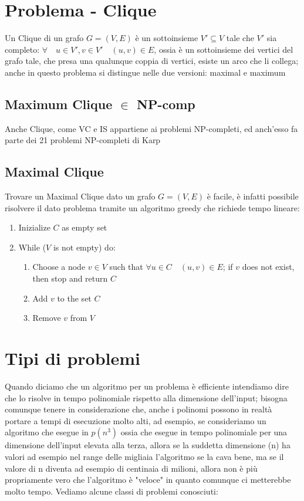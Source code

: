 \documentclass[12pt,a4paper]{article}
\begin{document}
\section{Problema - Clique}
Un Clique di un grafo $G = (V, E)$ è un sottoinsieme $V' \subseteq V$ tale che $V'$ sia completo:
$\forall \quad u \in V', v \in V' \quad (u, v) \in E$, ossia è un sottoinsieme dei vertici del grafo tale, che presa una qualunque coppia di vertici, esiste un arco che li collega; anche in questo problema si distingue nelle due versioni: maximal e maximum

\subsection{Maximum Clique $\in$ NP-comp}
Anche Clique, come VC e IS appartiene ai problemi NP-completi, ed anch'esso fa parte dei 21 problemi NP-completi di Karp

\subsection{Maximal Clique}
Trovare un Maximal Clique dato un grafo $G = (V, E)$ è facile, è infatti possibile risolvere il dato problema tramite un algoritmo greedy che richiede tempo lineare:
\begin{enumerate}
\item Inizialize $C$ as empty set
\item While ($V$ is not empty) do:
\begin{enumerate}
\item Choose a node $v \in V$ such that $\forall u \in C \quad (u, v) \in E$; if $v$ does not exist, then stop and return $C$
\item Add $v$ to the set $C$
\item Remove $v$ from $V$
\end{enumerate}
\end{enumerate}

\section{Tipi di problemi}
Quando diciamo che un algoritmo per un problema è efficiente intendiamo dire che lo risolve in tempo polinomiale rispetto alla dimensione dell'input; bisogna comunque tenere in considerazione che, anche i polinomi possono in realtà portare a tempi di esecuzione molto alti, ad esempio, se consideriamo un algoritmo che esegue in $p(n^{3})$ ossia che esegue in tempo polinomiale per una dimensione dell'input elevata alla terza, allora se la suddetta dimensione (n) ha valori ad esempio nel range delle migliaia l'algoritmo se la cava bene, ma se il valore di n diventa ad esempio di centinaia di milioni, allora non è più propriamente vero che l'algoritmo è "veloce" in quanto comunque ci metterebbe molto tempo. Vediamo alcune classi di problemi conosciuti:
\end{document}

